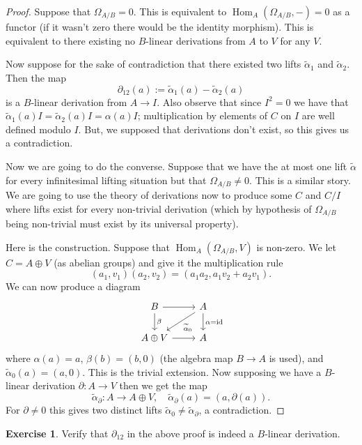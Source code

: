 \documentclass[12pt]{article}
\numberwithin{equation}{section}
\theoremstyle{definition}
\newtheorem{exercise}[theorem]{Exercise}
\theoremstyle{remark}
\newcommand{\id}{\operatorname{id}}
\newcommand{\Hom}{\operatorname{Hom}}
\begin{document}
\begin{proof}
	Suppose that $\Omega_{A/B}=0$. 
	This is equivalent to $\Hom_A(\Omega_{A/B},-)=0$ as a functor (if it wasn't zero there would be the identity morphism).
	This is equivalent to there existing no $B$-linear derivations from $A$ to $V$ for any $V$. 
	
	Now suppose for the sake of contradiction that there existed two lifts $\widetilde{\alpha}_1$ and $\widetilde{\alpha}_2$. 
	Then the map 
	$$\partial_{12}(a) := \widetilde{\alpha}_1(a) - \widetilde{\alpha}_2(a)$$ 
	is a $B$-linear derivation from $A \to I$. 
	Also observe that since $I^2=0$ we have that $\widetilde{\alpha}_1(a)I = \widetilde{\alpha}_2(a)I = \alpha(a) I$; multiplication by elements of $C$ on $I$ are well defined modulo $I$.
	But, we supposed that derivations don't exist, so this gives us a contradiction.
	
	Now we are going to do the converse.
	Suppose that we have the at most one lift $\widetilde{\alpha}$ for every infinitesimal lifting situation but that $\Omega_{A/B}\neq 0$. 
	This is a similar story. 
	We are going to use the theory of derivations now to produce some $C$ and $C/I$ where lifts exist for every non-trivial derivation (which by hypothesis of $\Omega_{A/B}$ being non-trivial must exist by its universal property).
	
	Here is the construction. Suppose that $\Hom_A(\Omega_{A/B},V)$ is non-zero. 
	We let $C = A\oplus V$ (as abelian groups) and give it the multiplication rule 
	$$ (a_1,v_1)(a_2,v_2) = (a_1a_2,a_1v_2+a_2v_1).$$
	We can now produce a diagram 
	$$ 
	\begin{tikzcd}
	B \ar[r] \ar[d, "\beta"] & A \ar[d, "\alpha=\id"] \ar[dl, "\widetilde{\alpha}_0"] \\
	A \oplus V \ar[r] & A
	\end{tikzcd}
	$$
	where $\alpha(a)=a$, $\beta(b) = (b,0)$ (the algebra map $B\to A$ is used), and $\widetilde{\alpha}_0(a) = (a,0)$.
	This is the trivial extension.
	Now supposing we have a $B$-linear derivation $\partial:A \to V$ then we get the map 
	$$\widetilde{\alpha}_{\partial}: A \to A\oplus V, \quad \widetilde{\alpha}_{\partial}(a) = (a,\partial(a)). $$
	For $\partial \neq 0$ this gives two distinct lifts $\widetilde{\alpha}_0 \neq \widetilde{\alpha}_{\partial}$, a contradiction. 
\end{proof}

\begin{exercise}
	Verify that $\partial_{12}$ in the above proof is indeed a $B$-linear derivation.
\end{exercise}
\end{document}
